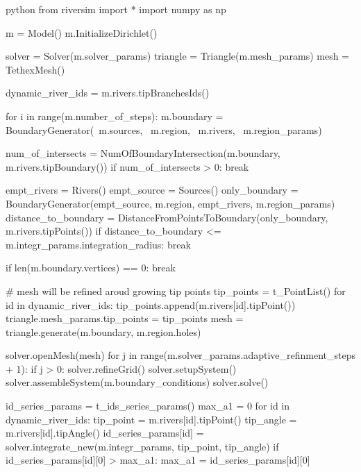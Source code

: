 \documentclass[]{pracamgr}
\begin{document}
    \begin{mintedbox}{python} 
      from riversim import *
      import numpy as np

      m = Model()
      m.InitializeDirichlet()

      solver = Solver(m.solver_params)
      triangle = Triangle(m.mesh_params)
      mesh = TethexMesh()

      dynamic_river_ids = m.rivers.tipBranchesIds()

      for i in range(m.number_of_steps):
          m.boundary = BoundaryGenerator(\
              m.sources, \
              m.region, \
              m.rivers, \
              m.region_params)

          num_of_intersects = NumOfBoundaryIntersection(m.boundary, m.rivers.tipBoundary())
          if num_of_intersects > 0:
              break

          empt_rivers = Rivers()
          empt_source = Sources()
          only_boundary = BoundaryGenerator(empt_source, m.region, empt_rivers, m.region_params)
          distance_to_boundary = DistanceFromPointsToBoundary(only_boundary, m.rivers.tipPoints())
          if distance_to_boundary <= m.integr_params.integration_radius:
              break

          if len(m.boundary.vertices) == 0:
              break 

          # mesh will be refined aroud growing tip points
          tip_points = t_PointList()
          for id in dynamic_river_ids:
              tip_points.append(m.rivers[id].tipPoint())
          triangle.mesh_params.tip_points = tip_points
          mesh = triangle.generate(m.boundary, m.region.holes)
              
          solver.openMesh(mesh)
          for j in range(m.solver_params.adaptive_refinment_steps + 1):
              if j > 0:
                  solver.refineGrid()
              solver.setupSystem()
              solver.assembleSystem(m.boundary_conditions)
              solver.solve()

          id_series_params = t_ids_series_params()
          max_a1 = 0
          for id in dynamic_river_ids:
              tip_point = m.rivers[id].tipPoint()
              tip_angle = m.rivers[id].tipAngle()
              id_series_params[id] = solver.integrate_new(m.integr_params, tip_point, tip_angle)
              if id_series_params[id][0] > max_a1:
                  max_a1 = id_series_params[id][0]


\end{mintedbox}
\end{document}
